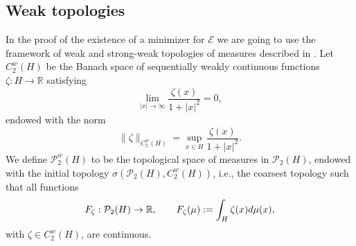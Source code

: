 \documentclass[12pt,a4paper]{article}
\newcommand{\R}{\mathbb{R}}
\renewcommand{\P}{\mathcal{P}}
\renewcommand{\d}{{\rm d}}
\newcommand{\X}{\mathcal{P}_2(H)}
\theoremstyle{plain}
\theoremstyle{definition}
\begin{document}
\subsection{Weak topologies}
\label{ssec:weak}
In the proof of the existence of a minimizer for $\mathcal E$ we are going to use the framework of weak and strong-weak topologies of measures described in \cite{naldi-savare}. Let $C_2^w(H)$ be the Banach space of sequentially weakly continuous functions $\zeta: H \to \R$ satisfying
\[
	\lim_{|x| \to \infty}\frac{\zeta(x)}{1+|x|^2}=0,
\]
endowed with the norm
\[
	\| \zeta \|_{C_2^w(H)}= \sup_{x \in H} \frac{\zeta(x)}{1+|x|^2}.
\]
We define $\P_2^w(H)$ to be the topological space of measures in $\X$, endowed with the initial topology $\sigma(\X,C_2^w(H))$, i.e., the coarsest topology such that all functions 
\[
	F_\zeta:\X \to \R,\qquad F_\zeta(\mu):= \int_H \zeta(x)\d\mu(x),
\] 
with $\zeta \in C_2^w(H)$, are continuous.
\end{document}

